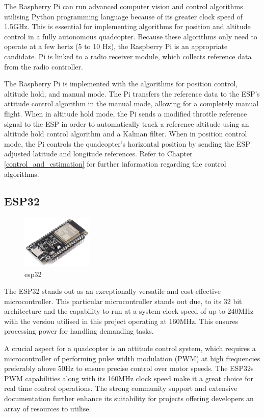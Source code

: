 \documentclass{report}
\begin{document}
The Raspberry Pi can run advanced computer vision and control algorithms
utilising Python programming language because of its greater clock speed of
1.5GHz. This is essential for implementing algorithms for position and altitude
control in a fully autonomous quadcopter. Because these algorithms only need to
operate at a few hertz (5 to 10 Hz), the Raspberry Pi is an appropriate
candidate. Pi is linked to a radio receiver module, which collects reference
data from the radio controller.

The Raspberry Pi is implemented with the algorithms for position control,
altitude hold, and manual mode. The Pi transfers the reference data to the ESP's
attitude control algorithm in the manual mode, allowing for a completely manual
flight. When in altitude hold mode, the Pi sends a modified throttle reference
signal to the ESP in order to automatically track a reference altitude using an
altitude hold control algorithm and a Kalman filter. When in position control
mode, the Pi controls the quadcopter's horizontal position by sending the ESP
adjusted latitude and longitude references. Refer to Chapter
\ref{control_and_estimation} for further information regarding the control
algorithms. 

\subsection{ESP32}
\begin{figure}[H]
  \centering
  \includegraphics[width=0.3\textwidth]{Pictures/esp32.png}
  \caption{esp32}
  \label{fig:esp32}
\end{figure}
The ESP32 stands out as an exceptionally versatile and cost-effective
microcontroller. This particular microcontroller stands out due, to its 32 bit
architecture and the capability to run at a system clock speed of up to 240MHz
with the version utilised in this project operating at 160MHz. This ensures
processing power for handling demanding tasks.

A crucial aspect for a quadcopter is an attitude control system, which requires
a microcontroller of performing pulse width modulation (PWM) at high frequencies
preferably above 50Hz to ensure precise control over motor speeds. The ESP32s
PWM capabilities along with its 160MHz clock speed make it a great choice for
real time control operations. The strong community support and extensive
documentation further enhance its suitability for projects offering developers
an array of resources to utilise.
\end{document}
